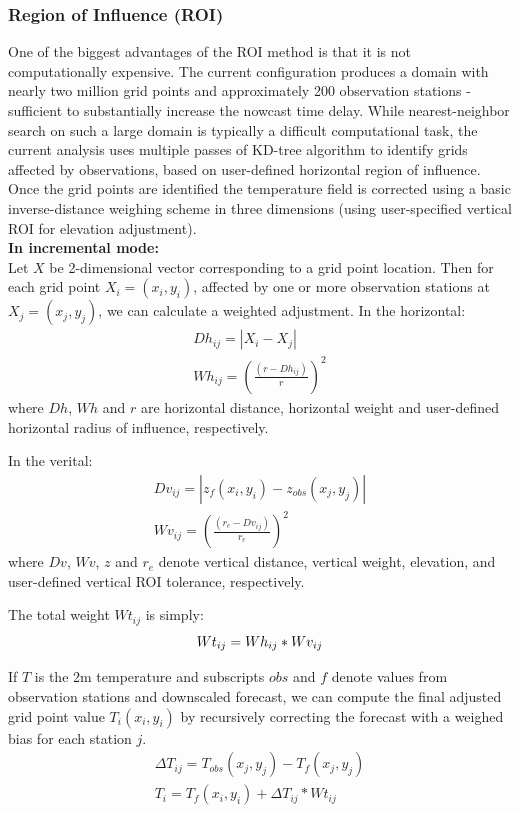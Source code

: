 \documentclass{article}
\begin{document}
\subsubsection{Region of Influence (ROI)}
One of the biggest advantages of the ROI method is that it is not computationally expensive. The current configuration produces a domain with nearly two million grid points and approximately 200 observation stations - sufficient to substantially increase the nowcast time delay. While nearest-neighbor search on such a large domain is typically a difficult computational task, the current analysis uses multiple passes of KD-tree algorithm \cite{KDtrees} to identify grids affected by observations, based on user-defined horizontal region of influence. Once the grid points are identified the temperature field is corrected using a basic inverse-distance weighing scheme in three dimensions (using user-specified vertical ROI for elevation adjustment).\\

\noindent\textbf{In incremental mode:}\\
Let $X$ be 2-dimensional vector corresponding to a grid point location. Then for each grid point $X_i = (x_i,y_i)$, affected by one or more observation stations at $X_j = (x_j,y_j)$, we can calculate a weighted adjustment. In the horizontal:
\begin{eqnarray}
Dh_{ij} = | X_{i} - X_{j} | \nonumber\\ 
Wh_{ij} = (\frac{(r - Dh_{ij})}{r})^2 \nonumber
\end{eqnarray}
where $Dh$, $Wh$ and $r$ are horizontal distance, horizontal weight and user-defined horizontal radius of influence, respectively. 

In the verital:
\begin{eqnarray}
Dv_{ij} = | z_{f}(x_i,y_i) - z_{obs}(x_j,y_j) | \nonumber\\
Wv_{ij} = (\frac{(r_e - Dv_{ij})}{r_e})^2 \nonumber
\end{eqnarray}
where $Dv$, $Wv$, $z$ and $r_e$ denote vertical distance, vertical weight, elevation, and user-defined vertical ROI tolerance, respectively. 

The total weight $Wt_{ij}$ is simply:
\begin{equation}\label{eq:Wt}
Wt_{ij} = Wh_{ij} * Wv_{ij}\\
\end{equation}

If $T$ is the 2m temperature and subscripts $obs$ and $f$ denote values from observation stations and downscaled forecast, we can compute the final adjusted grid point value $T_i(x_i,y_i)$ by recursively correcting the forecast with a weighed bias for each station $j$.
\begin{eqnarray}
\Delta T_{ij} = T_{obs}(x_j,y_j) - T_{f}(x_j,y_j) \nonumber\\ 
T_i = T_f(x_i,y_i) + \Delta T_{ij} * Wt_{ij}
\end{eqnarray}
\\
\end{document}
